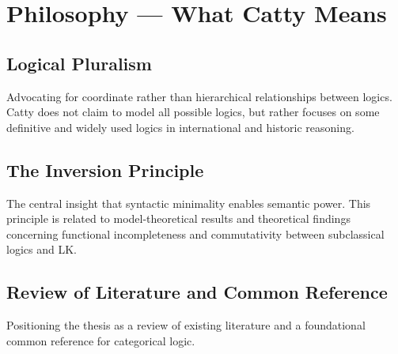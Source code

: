 
\chapter*{Philosophy --- What Catty Means}

\section*{Logical Pluralism}
Advocating for coordinate rather than hierarchical relationships between logics. Catty does not claim to model all possible logics, but rather focuses on some definitive and widely used logics in international and historic reasoning.

\section*{The Inversion Principle}
The central insight that syntactic minimality enables semantic power. This principle is related to model-theoretical results and theoretical findings concerning functional incompleteness and commutativity between subclassical logics and LK.

\section*{Review of Literature and Common Reference}
Positioning the thesis as a review of existing literature and a foundational common reference for categorical logic.
